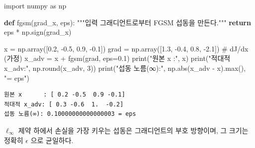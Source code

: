 \documentclass[
  letterpaper,
  DIV=11,
  numbers=noendperiod]{scrreprt}
\newenvironment{Shaded}{\begin{snugshade}}{\end{snugshade}}
\newcommand{\BuiltInTok}[1]{\textcolor[rgb]{0.00,0.23,0.31}{#1}}
\newcommand{\CommentTok}[1]{\textcolor[rgb]{0.37,0.37,0.37}{#1}}
\newcommand{\ControlFlowTok}[1]{\textcolor[rgb]{0.00,0.23,0.31}{\textbf{#1}}}
\newcommand{\DecValTok}[1]{\textcolor[rgb]{0.68,0.00,0.00}{#1}}
\newcommand{\FloatTok}[1]{\textcolor[rgb]{0.68,0.00,0.00}{#1}}
\newcommand{\ImportTok}[1]{\textcolor[rgb]{0.00,0.46,0.62}{#1}}
\newcommand{\KeywordTok}[1]{\textcolor[rgb]{0.00,0.23,0.31}{\textbf{#1}}}
\newcommand{\NormalTok}[1]{\textcolor[rgb]{0.00,0.23,0.31}{#1}}
\newcommand{\OperatorTok}[1]{\textcolor[rgb]{0.37,0.37,0.37}{#1}}
\newcommand{\StringTok}[1]{\textcolor[rgb]{0.13,0.47,0.30}{#1}}
\begin{document}
\begin{Shaded}
\begin{Highlighting}[]
\ImportTok{import}\NormalTok{ numpy }\ImportTok{as}\NormalTok{ np}

\KeywordTok{def}\NormalTok{ fgsm(grad\_x, eps):}
    \CommentTok{"""입력 그래디언트로부터 FGSM 섭동을 만든다."""}
    \ControlFlowTok{return}\NormalTok{ eps }\OperatorTok{*}\NormalTok{ np.sign(grad\_x)}

\NormalTok{x }\OperatorTok{=}\NormalTok{ np.array([}\FloatTok{0.2}\NormalTok{, }\OperatorTok{{-}}\FloatTok{0.5}\NormalTok{, }\FloatTok{0.9}\NormalTok{, }\OperatorTok{{-}}\FloatTok{0.1}\NormalTok{])}
\NormalTok{grad }\OperatorTok{=}\NormalTok{ np.array([}\FloatTok{1.3}\NormalTok{, }\OperatorTok{{-}}\FloatTok{0.4}\NormalTok{, }\FloatTok{0.8}\NormalTok{, }\OperatorTok{{-}}\FloatTok{2.1}\NormalTok{])   }\CommentTok{\# dJ/dx (가정)}
\NormalTok{x\_adv }\OperatorTok{=}\NormalTok{ x }\OperatorTok{+}\NormalTok{ fgsm(grad, eps}\OperatorTok{=}\FloatTok{0.1}\NormalTok{)}
\BuiltInTok{print}\NormalTok{(}\StringTok{"원본 x      :"}\NormalTok{, x)}
\BuiltInTok{print}\NormalTok{(}\StringTok{"적대적 x\_adv:"}\NormalTok{, np.}\BuiltInTok{round}\NormalTok{(x\_adv, }\DecValTok{3}\NormalTok{))}
\BuiltInTok{print}\NormalTok{(}\StringTok{"섭동 노름(∞):"}\NormalTok{, np.}\BuiltInTok{abs}\NormalTok{(x\_adv }\OperatorTok{{-}}\NormalTok{ x).}\BuiltInTok{max}\NormalTok{(), }\StringTok{"= eps"}\NormalTok{)}
\end{Highlighting}
\end{Shaded}

\begin{verbatim}
원본 x      : [ 0.2 -0.5  0.9 -0.1]
적대적 x_adv: [ 0.3 -0.6  1.  -0.2]
섭동 노름(∞): 0.10000000000000003 = eps
\end{verbatim}

\(\ell_\infty\) 제약 하에서 손실을 가장 키우는 섭동은 그래디언트의 부호
방향이며, 그 크기는 정확히 \(\epsilon\) 으로 균일하다.
\end{document}
